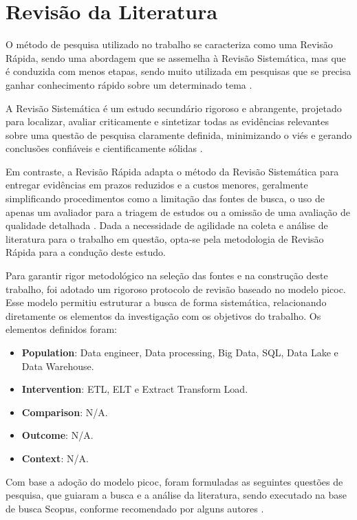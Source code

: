 \chapter{Revisão da Literatura}
\label{sec:revisãoliteratura}

O método de pesquisa utilizado no trabalho se caracteriza como uma Revisão Rápida, sendo uma abordagem que se assemelha à Revisão Sistemática, mas que é conduzida com menos etapas, sendo muito utilizada em pesquisas que se precisa ganhar conhecimento rápido sobre um determinado tema \cite[]{pena2025comparing}.

A Revisão Sistemática é um estudo secundário rigoroso e abrangente, projetado para localizar, avaliar criticamente e sintetizar todas as evidências relevantes sobre uma questão de pesquisa claramente definida, minimizando o viés e gerando conclusões confiáveis e cientificamente sólidas \cite[]{toma2016revisao, brereton2007lessons}.

Em contraste, a Revisão Rápida adapta o método da Revisão Sistemática para entregar evidências em prazos reduzidos e a custos menores, geralmente simplificando procedimentos como a limitação das fontes de busca, o uso de apenas um avaliador para a triagem de estudos ou a omissão de uma avaliação de qualidade detalhada \cite[]{pena2025comparing}. Dada a necessidade de agilidade na coleta e análise de literatura para o trabalho em questão, opta-se pela metodologia de Revisão Rápida para a condução deste estudo.

Para garantir rigor metodológico na seleção das fontes e na construção deste trabalho, foi adotado um rigoroso protocolo de revisão baseado no modelo \ac{picoc}. Esse modelo permitiu estruturar a busca de forma sistemática, relacionando diretamente os elementos da investigação com os objetivos do trabalho. Os elementos definidos foram:

\begin{itemize}
 	\item \textbf{Population}: Data engineer, Data processing, Big Data, SQL, Data Lake e Data Warehouse.
 	\item \textbf{Intervention}: ETL, ELT e Extract Transform Load.
 	\item \textbf{Comparison}: N/A.
 	\item \textbf{Outcome}: N/A.
 	\item \textbf{Context}: N/A.
\end{itemize}


Com base a adoção do modelo \ac{picoc}, foram formuladas as seguintes questões de pesquisa, que guiaram a busca e a análise da literatura, sendo executado na base de busca Scopus, conforme recomendado por alguns autores \cite[]{toma2016revisao, brereton2007lessons, pena2025comparing}.

